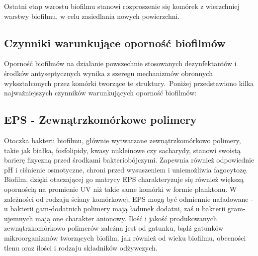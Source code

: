 \documentclass[11pt,a4paper]{report}
\begin{document}
Ostatni etap wzrostu biofilmu stanowi rozproszenie się komórek z wierzchniej warstwy biofilmu, w celu zasiedlania nowych powierzchni\cite{czaczyk}.
\subsection{Czynniki warunkujące oporność biofilmów}

Oporność biofilmów na działanie powszechnie stosowanych dezynfektantów i środków antyseptycznych wynika z szeregu mechanizmów obronnych wykształconych przez komórki tworzące te struktury.\
Poniżej przedstawiono kilka najważniejszych czynników warunkujących oporność biofilmów:

\subsection*{EPS - Zewnątrzkomórkowe polimery}

Otoczka bakterii biofilmu, głównie wytwarzane zewnątrzkomórkowo polimery, takie jak białka, fosfolipidy, kwasy nukleinowe czy sacharydy, stanowi swoistą barierę fizyczną przed środkami bakteriobójczymi. Zapewnia również odpowiednie pH i ciśnienie osmotyczne, chroni przed wysuszeniem i uniemożliwia fagocytozę.
Biofilm, dzięki otaczającej go matrycy EPS charakteryzuje się również większą opornością na promienie UV niż takie same komórki w formie planktonu\cite{leginowicz, salek}. 
W zależności od rodzaju ściany komórkowej, EPS mogą być odmiennie naładowane - u bakterii gam-dodatnich polimery mają ładunek dodatni, zaś u bakterii gram-ujemnych mają one charakter anionowy. Ilość i jakość produkowanych zewnątrzkomórkowo polimerów zależna jest od gatunku, bądź gatunków mikroorganizmów tworzących biofilm, jak również od wieku biofilmu, obecności tlenu oraz ilości i rodzaju składników odżywczych\cite{czaczyk-myszka, salek}.



\end{document}
